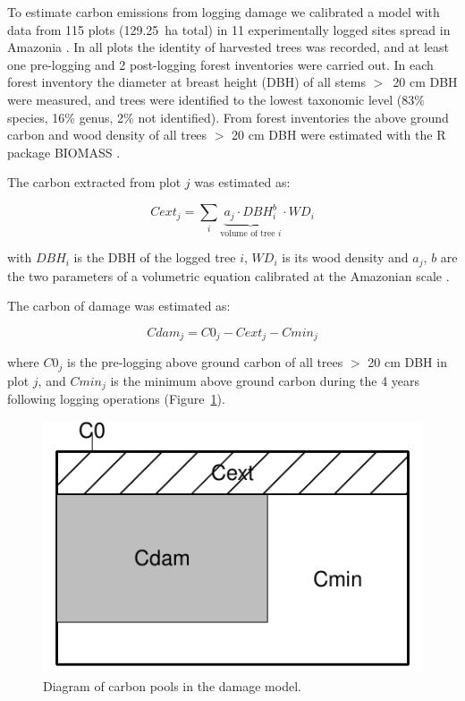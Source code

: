 \documentclass{article}
\begin{document}
To estimate carbon emissions from logging damage we calibrated a model with data from 115 plots (129.25~ha total) in 11 experimentally logged sites spread in Amazonia \cite{Sist2015}. In all plots the identity of harvested trees was recorded, and at least one pre-logging and 2 post-logging forest inventories were carried out. In each forest inventory the diameter at breast height (DBH) of all stems $>$~20 cm DBH were measured, and trees were identified to the lowest taxonomic level (83\% species, 16\% genus, 2\% not identified). 
From forest inventories the above ground carbon and wood density of all trees $>$ 20 cm DBH  were estimated with the R package BIOMASS \cite{Rejou-Mechain2017}. 

The carbon extracted from plot $j$ was estimated as: 

\begin{equation}
    Cext_j = \sum_{i} \underbrace{a_j \cdot DBH_i^b}_{\text{volume of tree $i$}} \cdot WD_i
\end{equation}

with $DBH_i$ is the DBH of the logged tree $i$, $WD_i$ is its wood density and $a_j$, $b$ are the two parameters of a volumetric equation calibrated at the Amazonian scale \cite{Piponiotc}. 

The carbon of damage was estimated as: 

\begin{equation}
    Cdam_j = C0_j - Cext_j - Cmin_j
\end{equation}

where $C0_j$ is the pre-logging above ground carbon of all trees $>$ 20 cm DBH in plot $j$, and $Cmin_j$ is the minimum above ground carbon during the 4 years following logging operations (Figure~\ref{fig:schemaDam}). 

\begin{figure}
    \centering
    \includegraphics[width=0.6\linewidth]{graphs/schemaDam.pdf}
    \caption{Diagram of carbon pools in the damage model.}
    \label{fig:schemaDam}
\end{figure}
\end{document}
